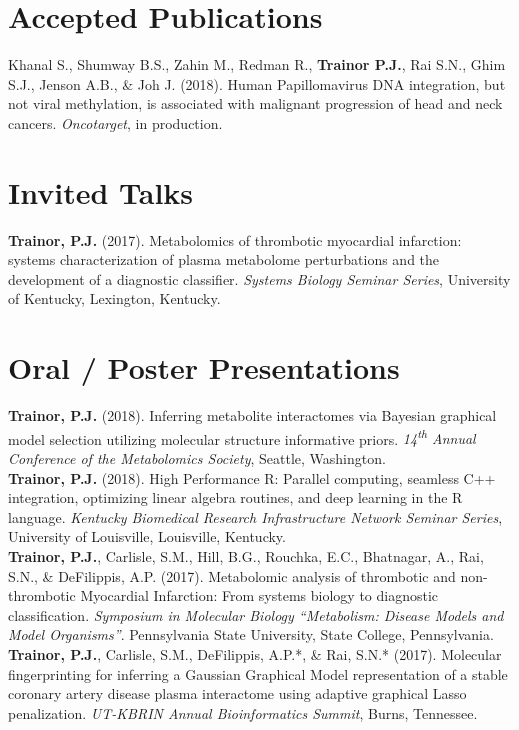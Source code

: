 \begin{DoubleSpace*}
{\section*{Accepted Publications}
Khanal S., Shumway B.S., Zahin M., Redman R., \textbf{Trainor P.J.}, Rai S.N., Ghim S.J., Jenson A.B., \& Joh J. (2018). Human Papillomavirus DNA integration, but not viral methylation, is associated with malignant progression of head and neck cancers. \emph{Oncotarget}, in production.

\section*{Invited Talks}
\textbf{Trainor, P.J.} (2017). Metabolomics of thrombotic myocardial infarction: systems characterization of plasma metabolome perturbations and the development of a diagnostic classifier. \emph{Systems Biology Seminar Series}, University of Kentucky, Lexington, Kentucky.

\section*{Oral / Poster Presentations}
\textbf{Trainor, P.J.} (2018). Inferring metabolite interactomes via Bayesian graphical model selection utilizing molecular structure informative priors. \emph{14\textsuperscript{th} Annual Conference of the Metabolomics Society}, Seattle, Washington.  \\ 

\textbf{Trainor, P.J.} (2018). High Performance R: Parallel computing, seamless C++ integration, optimizing linear algebra routines, and deep learning in the R language. \emph{Kentucky Biomedical Research Infrastructure Network Seminar Series}, University of Louisville, Louisville, Kentucky.  \\ 

\textbf{Trainor, P.J.}, Carlisle, S.M., Hill, B.G., Rouchka, E.C., Bhatnagar, A., Rai, S.N., \& DeFilippis, A.P. (2017). Metabolomic analysis of thrombotic and non-thrombotic Myocardial Infarction: From systems biology to diagnostic classification. \emph{Symposium in Molecular Biology ``Metabolism: Disease Models and Model Organisms''}. Pennsylvania State University, State College, Pennsylvania.  \\ 

\textbf{Trainor, P.J.}, Carlisle, S.M., DeFilippis, A.P.*, \& Rai, S.N.* (2017). Molecular fingerprinting for inferring a Gaussian Graphical Model representation of a stable coronary artery disease plasma interactome using adaptive graphical Lasso penalization. \emph{UT-KBRIN Annual Bioinformatics Summit}, Burns, Tennessee.  \\ 

}
\end{DoubleSpace*}
